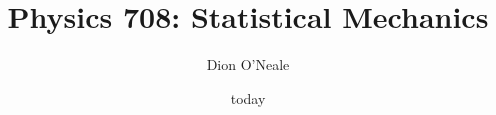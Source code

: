 \documentclass{article}
\title{Physics 708: Statistical Mechanics}
\author{Dion O'Neale}
\date{today}
\begin{document}
\maketitle

%



%

%

%

%

%

%

%







\\
\\
\end{document}
